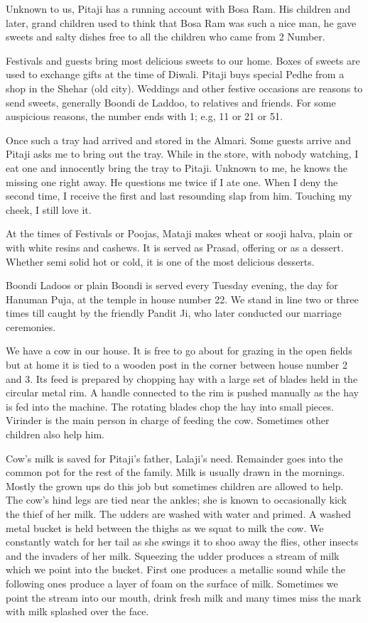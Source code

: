 Unknown to us, Pitaji has a running account with Bosa Ram. His children
and later, grand children used to think that Bosa Ram was such a nice man,
he gave sweets and salty dishes free to all the children who came from
2 Number. 

Festivals and guests bring most delicious sweets to our home. Boxes of
sweets are used to exchange gifts at the time of Diwali. Pitaji buys
special Pedhe from a shop in the Shehar (old city). Weddings and other
festive occasions are reasons to send sweets, generally Boondi de Laddoo,
to relatives and friends. For some auspicious reasons, the number ends
with 1; e.g, 11 or 21 or 51. 

Once such a tray had arrived and stored in the Almari. Some guests arrive
and Pitaji asks me to bring out the tray. While in the store, with nobody
watching, I eat one and innocently bring the tray to Pitaji. Unknown to
me, he knows the missing one right away. He questions me twice if I ate
one. When I deny the second time, I receive the first and last resounding
slap from him. Touching my cheek, I still love it. 

At the times of Festivals or Poojas, Mataji makes wheat or sooji halva,
plain or with white resins and cashews. It is served as Prasad, offering
or as a dessert. Whether semi solid hot or cold, it is one of the most
delicious desserts. 

Boondi Ladoos or plain Boondi is served every Tuesday evening, the day for
Hanuman Puja, at the temple in house number 22. We stand in line two or
three times till caught by the friendly Pandit Ji, who later conducted our
marriage ceremonies. 

We have a cow in our house. It is free to go about for grazing in the open
fields but at home it is tied to a wooden post in the corner between house
number 2 and 3. Its feed is prepared by chopping hay with a large set of
blades held in the circular metal rim. A handle connected to the rim is
pushed manually as the hay is fed into the machine. The rotating blades
chop the hay into small pieces. Virinder is the main person in charge of
feeding the cow. Sometimes other children also help him. 

Cow's milk is saved for Pitaji's father, Lalaji’s need. Remainder goes
into the common pot for the rest of the family. Milk is usually drawn in
the mornings. Mostly the grown ups do this job but sometimes children are
allowed to help. The cow's hind legs are tied near the ankles; she is
known to occasionally kick the thief of her milk. The udders are washed
with water and primed. A washed metal bucket is held between the thighs as
we squat to milk the cow. We constantly watch for her tail as she swings
it to shoo away the flies, other insects and the invaders of her milk.
Squeezing the udder produces a stream of milk which we point into the
bucket. First one produces a metallic sound while the following ones
produce a layer of foam on the surface of milk. Sometimes we point the
stream into our mouth, drink fresh milk and many times miss the mark with
milk splashed over the face. 

